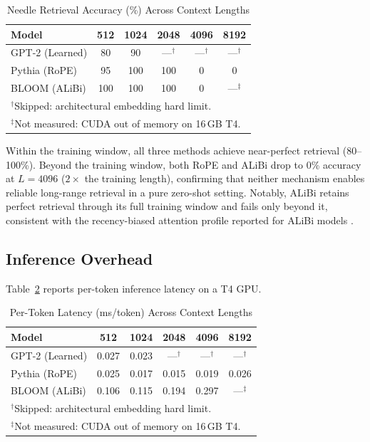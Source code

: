 \documentclass[conference]{IEEEtran}
\begin{document}
\begin{table}[!t]
\caption{Needle Retrieval Accuracy (\%) Across Context Lengths}
\label{tab:needle}
\centering
\begin{tabular}{lccccc}
\hline
\textbf{Model} & \textbf{512} & \textbf{1024} & \textbf{2048} & \textbf{4096} & \textbf{8192} \\
\hline
GPT-2 (Learned) & 80 & 90 & ---$^\dagger$ & ---$^\dagger$ & ---$^\dagger$ \\
Pythia (RoPE) & 95 & 100 & 100 & 0 & 0 \\
BLOOM (ALiBi) & 100 & 100 & 100 & 0 & ---$^\ddagger$ \\
\hline
\multicolumn{6}{l}{\small $^\dagger$Skipped: architectural embedding hard limit.} \\
\multicolumn{6}{l}{\small $^\ddagger$Not measured: CUDA out of memory on 16\,GB T4.} \\
\end{tabular}
\end{table}

Within the training window, all three methods achieve near-perfect retrieval (80--100\%). Beyond the training window, both RoPE and ALiBi drop to 0\% accuracy at $L{=}4096$ ($2\times$ the training length), confirming that neither mechanism enables reliable long-range retrieval in a pure zero-shot setting. Notably, ALiBi retains perfect retrieval through its full training window and fails only beyond it, consistent with the recency-biased attention profile reported for ALiBi models \cite{press2022}.

\subsection{Inference Overhead}

Table~\ref{tab:latency} reports per-token inference latency on a T4 GPU.

\begin{table}[!t]
\caption{Per-Token Latency (ms/token) Across Context Lengths}
\label{tab:latency}
\centering
\begin{tabular}{lccccc}
\hline
\textbf{Model} & \textbf{512} & \textbf{1024} & \textbf{2048} & \textbf{4096} & \textbf{8192} \\
\hline
GPT-2 (Learned) & 0.027 & 0.023 & ---$^\dagger$ & ---$^\dagger$ & ---$^\dagger$ \\
Pythia (RoPE) & 0.025 & 0.017 & 0.015 & 0.019 & 0.026 \\
BLOOM (ALiBi) & 0.106 & 0.115 & 0.194 & 0.297 & ---$^\ddagger$ \\
\hline
\multicolumn{6}{l}{\small $^\dagger$Skipped: architectural embedding hard limit.} \\
\multicolumn{6}{l}{\small $^\ddagger$Not measured: CUDA out of memory on 16\,GB T4.} \\
\end{tabular}
\end{table}
\end{document}
